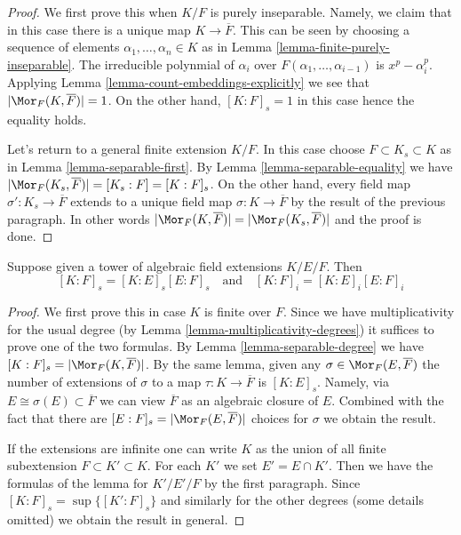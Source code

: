 \begin{proof}
We first prove this when $K/F$ is purely inseparable. Namely, we claim that
in this case there is a unique map $K \to \overline{F}$. This can be
seen by choosing a sequence of elements $\alpha_1, \ldots, \alpha_n \in K$
as in Lemma \ref{lemma-finite-purely-inseparable}. The irreducible polynmial
of $\alpha_i$ over $F(\alpha_1, \ldots, \alpha_{i - 1})$ is $x^p - \alpha_i^p$.
Applying Lemma \ref{lemma-count-embeddings-explicitly} we see that
$|\Mor_F(K, \overline{F})| = 1$. On the other hand, $[K : F]_s = 1$
in this case hence the equality holds.

\medskip\noindent
Let's return to a general finite extension $K/F$. In this case
choose $F \subset K_s \subset K$ as in Lemma \ref{lemma-separable-first}.
By Lemma \ref{lemma-separable-equality} we have
$|\Mor_F(K_s, \overline{F})| = [K_s : F] = [K : F]_s$.
On the other hand, every field map $\sigma' : K_s \to \overline{F}$
extends to a unique field map $\sigma : K \to \overline{F}$ by the
result of the previous paragraph. In other words
$|\Mor_F(K, \overline{F})| = |\Mor_F(K_s, \overline{F})|$
and the proof is done.
\end{proof}

\begin{lemma}[Multiplicativity]
\label{lemma-multiplicativity-all-degrees}
Suppose given a tower of algebraic field extensions $K/E/F$. Then
$$
[K : F]_s = [K : E]_s [E : F]_s
\quad\text{and}\quad
[K : F]_i = [K : E]_i [E : F]_i
$$
\end{lemma}

\begin{proof}
We first prove this in case $K$ is finite over $F$. Since we have
multiplicativity for the usual degree (by
Lemma \ref{lemma-multiplicativity-degrees}) it suffices to prove
one of the two formulas. By Lemma \ref{lemma-separable-degree} we have
$[K : F]_s = |\Mor_F(K, \overline{F})|$. By the same lemma,
given any $\sigma \in \Mor_F(E, \overline{F})$ the number of extensions
of $\sigma$ to a map $\tau : K \to \overline{F}$ is $[K : E]_s$.
Namely, via $E \cong \sigma(E) \subset \overline{F}$ we can view
$\overline{F}$ as an algebraic closure of $E$. Combined with the
fact that there are $[E : F]_s = |\Mor_F(E, \overline{F})|$ choices
for $\sigma$ we obtain the result.

\medskip\noindent
If the extensions are infinite one can write $K$ as the union
of all finite subextension $F \subset K' \subset K$. For each
$K'$ we set $E' = E \cap K'$. Then we have the formulas of the
lemma for $K'/E'/F$ by the first paragraph. Since
$[K : F]_s = \sup \{[K' : F]_s\}$ and similarly for the other
degrees (some details omitted) we obtain the result in general.
\end{proof}









